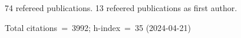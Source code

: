74 refereed publications. 13 refeered publications as first author.

Total citations~=~3992; h-index~=~35 (2024-04-21)